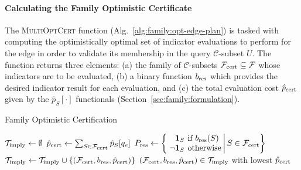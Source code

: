 \paragraph{Calculating the Family Optimistic Certificate}
The \textsc{MultiOptCert} function (Alg.~\ref{alg:family:opt-edge-plan})
is tasked with computing
the optimistically optimal set of indicator evaluations to perform
for the edge in order to validate its membership in the query
$\mathcal{C}$-subset $U$.
The function returns three elements:
(a) the family of $\mathcal{C}$-subsets
$\mathcal{F}_{\mbox{\scriptsize cert}} \subseteq \mathcal{F}$
whose indicators are to be evaluated,
(b) a binary function $b_{\mbox{\scriptsize res}}$
which provides the desired indicator result for each evaluation,
and (c) the total evaluation cost ${\hat p}_{\mbox{\scriptsize cert}}$
given by the $\hat{p}_S[\cdot]$ functionals
(Section~\ref{sec:family:formulation}).

\begin{algorithm}
\caption{Family Optimistic Certification}
\label{alg:family:opt-edge-plan}
\begin{algorithmic}[1]
   \State $\mathcal{T}_{\mbox{\scriptsize imply}} \leftarrow \emptyset$
         \label{line:family:power-set}
      \State ${\hat p}_{\mbox{\scriptsize cert}} \leftarrow \sum_{S \in \mathcal{F}_{\mbox{\scriptsize cert}}} \hat{p}_S[q_e]$
            \label{line:family:all-binary-functions}
         \State $\arraycolsep=2pt
            P_{\ms{res}} \leftarrow
            \left\{\left. \begin{array}{rl}
            \mathbf{1}_S & \mbox{if } b_{\ms{res}}(S) \\
            \lnot \mathbf{1}_S & \mbox{otherwise} \\
            \end{array}
            \right|
            S \in \mathcal{F}_{\ms{cert}}
            \right\}$
            \State $\mathcal{T}_{\mbox{\scriptsize imply}} \leftarrow
               \mathcal{T}_{\mbox{\scriptsize imply}} \cup
               \{ (\mathcal{F}_{\mbox{\scriptsize cert}}, b_{\mbox{\scriptsize res}}, {\hat p}_{\mbox{\scriptsize cert}}) \}$
         \EndIf
      \EndFor
   \EndFor
   \State \Return $(\mathcal{F}_{\mbox{\scriptsize cert}}, b_{\mbox{\scriptsize res}}, {\hat p}_{\mbox{\scriptsize cert}})
      \in \mathcal{T}_{\mbox{\scriptsize imply}}$
      with lowest ${\hat p}_{\mbox{\scriptsize cert}}$
\EndFunction
\end{algorithmic}
\end{algorithm}


